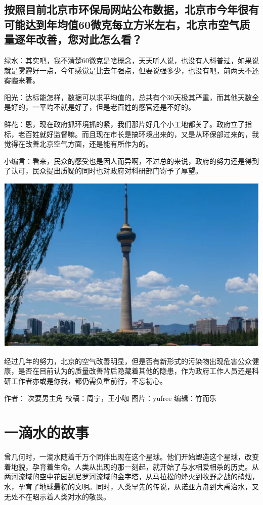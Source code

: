 \documentclass[]{book}
\begin{document}
\subsection{按照目前北京市环保局网站公布数据，北京市今年很有可能达到年均值60微克每立方米左右，北京市空气质量逐年改善，您对此怎么看？}\label{60}

绿水：其实吧，我不清楚60微克是啥概念，天天听人说，也没有人科普过，如果说就是雾霾好一点，今年感觉是比去年强点，但要说强多少，也没有吧，前两天不还雾霾来着。

阳光：达标能怎样，数据可以求平均值的，总共有个30天极其严重，而其他天数全是好的，一平均不就是好了，但是老百姓的感官还是不好的。

鲜花：恩，现在政府抓环境抓的紧，我们那片好几个小工地都关了。政府立了指标，老百姓就好监督嘛。而且现在市长是搞环境出来的，又是从环保部过来的，我觉得在改善北京空气方面，还是能有所作为的。

小编言：看来，民众的感受也是因人而异啊，不过总的来说，政府的努力还是得到了认可，民众提出质疑的同时也对政府对科研部门寄予了厚望。

\includegraphics[width=8.33in]{images/air5}

经过几年的努力，北京的空气改善明显，但是否有新形式的污染物出现危害公众健康，是否在目前认为的质量改善背后隐藏着其他的隐患，作为政府工作人员还是科研工作者亦或是你我，都仍需负重前行，不忘初心。

作者： 次要男主角 校稿：周宁，王小咖 图片：yufree 编辑：竹而乐

\section{一滴水的故事}

曾几何时，一滴水随着千万个同伴出现在这个星球。他们开始塑造这个星球，改变着地貌，孕育着生命。人类从出现的那一刻起，就开始了与水相爱相杀的历史。从两河流域的空中花园到尼罗河流域的金字塔，从马拉松的烽火到牧野之战的硝烟，水，孕育了地球最初的文明。同时，人类早先的传说，从诺亚方舟到大禹治水，又无处不在昭示着人类对水的敬畏。
\end{document}
